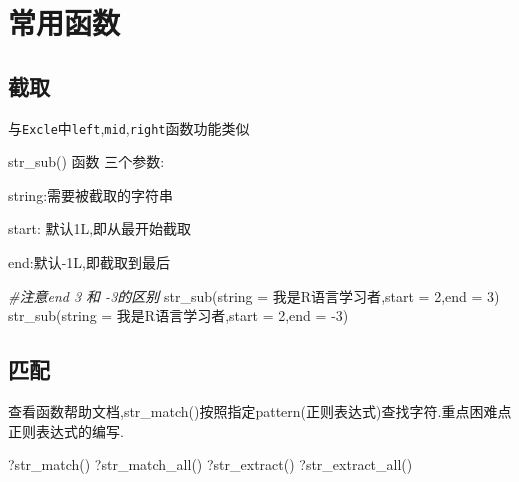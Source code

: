 \documentclass[
]{book}
\newenvironment{Shaded}{\begin{snugshade}}{\end{snugshade}}
\newcommand{\AttributeTok}[1]{\textcolor[rgb]{0.77,0.63,0.00}{#1}}
\newcommand{\CommentTok}[1]{\textcolor[rgb]{0.56,0.35,0.01}{\textit{#1}}}
\newcommand{\DecValTok}[1]{\textcolor[rgb]{0.00,0.00,0.81}{#1}}
\newcommand{\FunctionTok}[1]{\textcolor[rgb]{0.00,0.00,0.00}{#1}}
\newcommand{\NormalTok}[1]{#1}
\newcommand{\SpecialCharTok}[1]{\textcolor[rgb]{0.00,0.00,0.00}{#1}}
\newcommand{\StringTok}[1]{\textcolor[rgb]{0.31,0.60,0.02}{#1}}
\begin{document}
\hypertarget{ux5e38ux7528ux51fdux6570-1}{%
\section{常用函数}\label{ux5e38ux7528ux51fdux6570-1}}

\hypertarget{ux622aux53d6}{%
\subsection{截取}\label{ux622aux53d6}}

与\texttt{Excle}中\texttt{left},\texttt{mid},\texttt{right}函数功能类似

str\_sub() 函数 三个参数:

string:需要被截取的字符串

start: 默认1L,即从最开始截取

end:默认-1L,即截取到最后

\begin{Shaded}
\begin{Highlighting}[]
\CommentTok{\#注意end 3 和 {-}3的区别}
\FunctionTok{str\_sub}\NormalTok{(}\AttributeTok{string =} \StringTok{\textquotesingle{}我是R语言学习者\textquotesingle{}}\NormalTok{,}\AttributeTok{start =} \DecValTok{2}\NormalTok{,}\AttributeTok{end =} \DecValTok{3}\NormalTok{)}
\FunctionTok{str\_sub}\NormalTok{(}\AttributeTok{string =} \StringTok{\textquotesingle{}我是R语言学习者\textquotesingle{}}\NormalTok{,}\AttributeTok{start =} \DecValTok{2}\NormalTok{,}\AttributeTok{end =} \SpecialCharTok{{-}}\DecValTok{3}\NormalTok{)}
\end{Highlighting}
\end{Shaded}

\hypertarget{ux5339ux914d}{%
\subsection{匹配}\label{ux5339ux914d}}

查看函数帮助文档,str\_match()按照指定pattern(正则表达式)查找字符.重点困难点正则表达式的编写.

\begin{Shaded}
\begin{Highlighting}[]
\NormalTok{?}\FunctionTok{str\_match}\NormalTok{()}
\NormalTok{?}\FunctionTok{str\_match\_all}\NormalTok{()}
\NormalTok{?}\FunctionTok{str\_extract}\NormalTok{()}
\NormalTok{?}\FunctionTok{str\_extract\_all}\NormalTok{()}
\end{Highlighting}
\end{Shaded}
\end{document}
